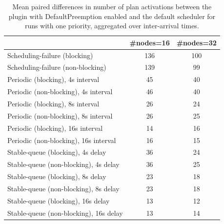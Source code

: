 \begin{table}[t]
\tiny
\setlength{\tabcolsep}{1.2pt}
\renewcommand{\arraystretch}{1.12}
\centering
\caption{Mean paired differences in number of plan activations between the plugin with DefaultPreemption enabled and the default scheduler for runs with one priority, aggregated over inter-arrival times.}
\label{tab:plan_activations-defpreempt1-prio1-std0-agg-arrival}
\begin{tabular}{l c c}
\toprule
 & \#nodes=16 & \#nodes=32 \\
\midrule
Scheduling-failure (blocking) & 136 & 100 \\
Scheduling-failure (non-blocking) & 139 & 99 \\
Periodic (blocking), 4s interval & 45 & 40 \\
Periodic (non-blocking), 4s interval & 46 & 40 \\
Periodic (blocking), 8s interval & 26 & 24 \\
Periodic (non-blocking), 8s interval & 26 & 25 \\
Periodic (blocking), 16s interval & 14 & 16 \\
Periodic (non-blocking), 16s interval & 16 & 15 \\
Stable-queue (blocking), 4s delay & 36 & 24 \\
Stable-queue (non-blocking), 4s delay & 36 & 25 \\
Stable-queue (blocking), 8s delay & 23 & 18 \\
Stable-queue (non-blocking), 8s delay & 23 & 18 \\
Stable-queue (blocking), 16s delay & 13 & 12 \\
Stable-queue (non-blocking), 16s delay & 13 & 14 \\
\bottomrule
\end{tabular}
\end{table}
